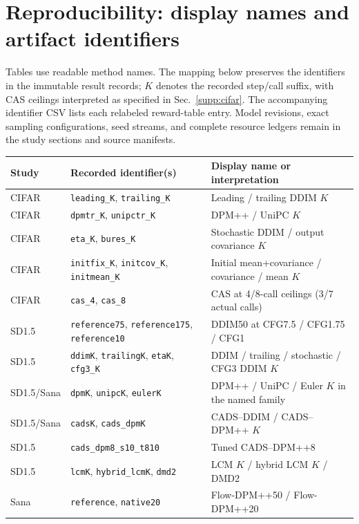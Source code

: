 \section{Reproducibility: display names and artifact identifiers}
\label{supp:identifiers}
Tables use readable method names. The mapping below preserves the identifiers
in the immutable result records; $K$ denotes the recorded step/call suffix,
with CAS ceilings interpreted as specified in Sec.~\ref{supp:cifar}.
The accompanying identifier CSV lists each relabeled reward-table entry.
Model revisions, exact sampling configurations, seed streams, and complete
resource ledgers remain in the study sections and source manifests.

\begin{minipage}{\textwidth}
\centering\footnotesize
\captionsetup{hypcap=false}
\setlength{\tabcolsep}{5pt}
\begin{tabular}{lll}
\toprule
Study & Recorded identifier(s) & Display name or interpretation \\
\midrule
CIFAR & \texttt{leading\_K}, \texttt{trailing\_K} & Leading / trailing DDIM $K$ \\
CIFAR & \texttt{dpmtr\_K}, \texttt{unipctr\_K} & DPM++ / UniPC $K$ \\
CIFAR & \texttt{eta\_K}, \texttt{bures\_K} & Stochastic DDIM / output covariance $K$ \\
CIFAR & \texttt{initfix\_K}, \texttt{initcov\_K}, \texttt{initmean\_K} & Initial mean+covariance / covariance / mean $K$ \\
CIFAR & \texttt{cas\_4}, \texttt{cas\_8} & CAS at 4/8-call ceilings (3/7 actual calls) \\
SD1.5 & \texttt{reference75}, \texttt{reference175}, \texttt{reference10} & DDIM50 at CFG7.5 / CFG1.75 / CFG1 \\
SD1.5 & \texttt{ddimK}, \texttt{trailingK}, \texttt{etaK}, \texttt{cfg3\_K} & DDIM / trailing / stochastic / CFG3 DDIM $K$ \\
SD1.5/Sana & \texttt{dpmK}, \texttt{unipcK}, \texttt{eulerK} & DPM++ / UniPC / Euler $K$ in the named family \\
SD1.5/Sana & \texttt{cadsK}, \texttt{cads\_dpmK} & CADS--DDIM / CADS--DPM++ $K$ \\
SD1.5 & \texttt{cads\_dpm8\_s10\_t810} & Tuned CADS--DPM++8 \\
SD1.5 & \texttt{lcmK}, \texttt{hybrid\_lcmK}, \texttt{dmd2} & LCM $K$ / hybrid LCM $K$ / DMD2 \\
Sana & \texttt{reference}, \texttt{native20} & Flow-DPM++50 / Flow-DPM++20 \\

\end{tabular}
\end{minipage}
